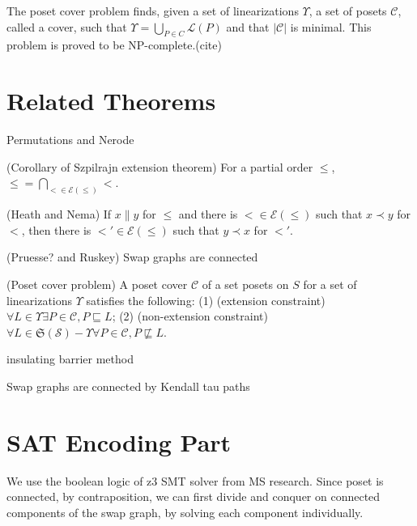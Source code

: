 \documentclass{llncs}
\begin{document}
The poset cover problem finds, given a set of linearizations $\Upsilon$, a set of posets $\mathcal{C}$, called a cover, such that $\Upsilon = \bigcup_{P \in C} \mathcal{L}(P)$ and that $|\mathcal{C}|$ is minimal. This problem is proved to be NP-complete.(cite)

\section{Related Theorems}

\begin{theorem}
    Permutations and Nerode
\end{theorem}

\begin{theorem}
    (Corollary of Szpilrajn extension theorem) For a partial order $\leq$, $\leq = \bigcap_{< \in \mathcal{E}(\leq)} <$.
\end{theorem}

\begin{theorem}
    (Heath and Nema) If $x \parallel y$ for $\leq$ and there is $< \in \mathcal{E}(\leq)$ such that $x \prec y$ for $<$, then there is $<' \in \mathcal{E}(\leq)$ such that $y \prec x$ for $<'$.
\end{theorem}

\begin{theorem}
    (Pruesse? and Ruskey) Swap graphs are connected
\end{theorem}

\begin{definition}
    (Poset cover problem) A poset cover $\mathcal{C}$ of a set posets on $S$ for a set of linearizations $\Upsilon$ satisfies the following: (1) (extension constraint) $\forall L \in \Upsilon \exists P \in \mathcal{C}, P \sqsubseteq L$; (2) (non-extension constraint) $\forall L \in \mathfrak{S}(\mathcal{S}) - \Upsilon \forall P \in \mathcal{C}, P \not\sqsubseteq L$.
\end{definition}

\begin{theorem}
    insulating barrier method
\end{theorem}

\begin{theorem}
    Swap graphs are connected by Kendall tau paths
\end{theorem}

\section{SAT Encoding Part}
We use the boolean logic of z3 SMT solver from MS research. Since poset is connected, by contraposition, we can first divide and conquer on connected components of the swap graph, by solving each component individually.
\end{document}
